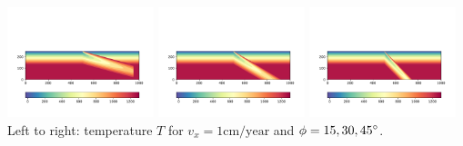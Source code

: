 \begin{center}
\includegraphics[width=0.32\textwidth]{images/mckenzie/temperature2_vel1_phi15.pdf}
\includegraphics[width=0.32\textwidth]{images/mckenzie/temperature2_vel1_phi30.pdf}
\includegraphics[width=0.32\textwidth]{images/mckenzie/temperature2_vel1_phi45.pdf}\\
{\small Left to right: temperature $T$ for $v_x=1\text{cm/year}$ and $\phi={15,30,45}\degree$.}
\end{center}











